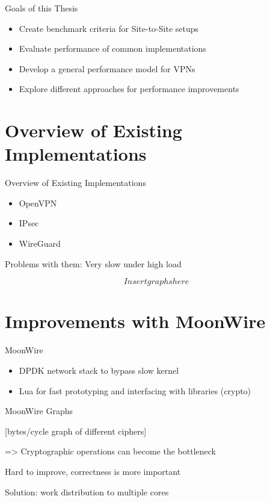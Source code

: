 \documentclass[NET,english]{tumbeamer}
\begin{document}
\begin{frame}{Goals of this Thesis}
	\begin{itemize}
		\item Create benchmark criteria for Site-to-Site setups
		\item Evaluate performance of common implementations
		\item Develop a general performance model for VPNs
		\item Explore different approaches for performance improvements
	\end{itemize}
\end{frame}

\section{Overview of Existing Implementations}
\begin{frame}{Overview of Existing Implementations}
	\begin{itemize}
		\item OpenVPN
		\item IPsec
		\item WireGuard
	\end{itemize}

	Problems with them: Very slow under high load
\end{frame}

\begin{frame}
	\[ Insert graphs here \]
\end{frame}

\section{Improvements with MoonWire}
\begin{frame}{MoonWire}
	\begin{itemize}
		\item DPDK network stack to bypass slow kernel
		\item Lua for fast prototyping and interfacing with libraries (crypto)
	\end{itemize}
\end{frame}

\begin{frame}{MoonWire Graphs}
	 
	 [bytes/cycle graph of different ciphers]
	
	=> Cryptographic operations can become the bottleneck

	Hard to improve, correctness is more important
	
	Solution: work distribution to multiple cores
\end{frame}
\end{document}
